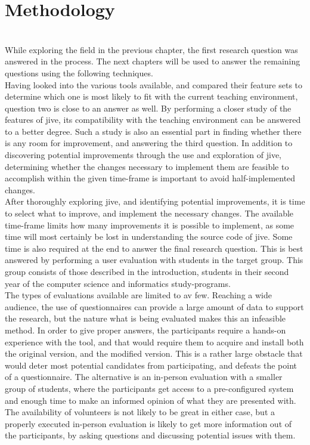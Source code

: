\chapter{Methodology}\label{methodology}
~\\
While exploring the field in the previous chapter, the first research question was answered in the process.
The next chapters will be used to answer the remaining questions using the following techniques.
~\\

Having looked into the various tools available, and compared their feature sets to determine which one is most likely to fit with the current teaching environment, question two is close to an answer as well.
By performing a closer study of the features of \gls{jive}, its compatibility with the teaching environment can be answered to a better degree.
Such a study is also an essential part in finding whether there is any room for improvement, and answering the third question.
In addition to discovering potential improvements through the use and exploration of \gls{jive}, determining whether the changes necessary to implement them are feasible to accomplish within the given time-frame is important to avoid half-implemented changes.
~\\

After thoroughly exploring \gls{jive}, and identifying potential improvements, it is time to select what to improve, and implement the necessary changes.
The available time-frame limits how many improvements it is possible to implement, as some time will most certainly be lost in understanding the source code of \gls{jive}.
Some time is also required at the end to answer the final research question.
This is best answered by performing a user evaluation with students in the target group.
This group consists of those described in the introduction, students in their second year of the computer science and informatics study-programs.
~\\

The types of evaluations available are limited to av few.
Reaching a wide audience, the use of questionnaires can provide a large amount of data to support the research, but the nature what is being evaluated makes this an infeasible method.
In order to give proper answers, the participants require a hands-on experience with the tool, and that would require them to acquire and install both the original version, and the modified version.
This is a rather large obstacle that would deter most potential candidates from participating, and defeats the point of a questionnaire.
The alternative is an in-person evaluation with a smaller group of students, where the participants get access to a pre-configured system and enough time to make an informed opinion of what they are presented with.
The availability of volunteers is not likely to be great in either case, but a properly executed in-person evaluation is likely to get more information out of the participants, by asking questions and discussing potential issues with them.



